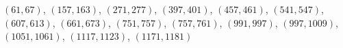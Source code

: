 $(61,67)$, $(157,163)$, $(271,277)$, $(397,401)$, $(457,461)$, $(541,547)$, $(607,613)$, $(661,673)$, $(751,757)$, $(757,761)$, $(991,997)$, $(997,1009)$, $(1051,1061)$, $(1117,1123)$, $(1171,1181)$